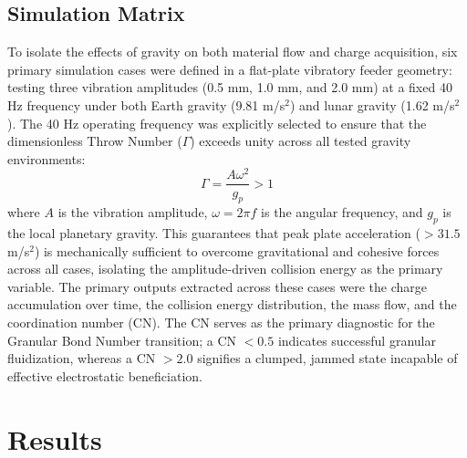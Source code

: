 \documentclass[preprint,12pt,authoryear]{elsarticle}
\begin{document}
\subsection{Simulation Matrix}
To isolate the effects of gravity on both material flow and charge acquisition, six primary simulation cases were defined in a flat-plate vibratory feeder geometry: testing three vibration amplitudes (0.5 mm, 1.0 mm, and 2.0 mm) at a fixed 40 Hz frequency under both Earth gravity (9.81 m/s$^2$) and lunar gravity (1.62 m/s$^2$). The 40 Hz operating frequency was explicitly selected to ensure that the dimensionless Throw Number ($\Gamma$) exceeds unity across all tested gravity environments:
\begin{equation}
\Gamma = \frac{A \omega^2}{g_p} > 1
\end{equation}
where $A$ is the vibration amplitude, $\omega = 2\pi f$ is the angular frequency, and $g_p$ is the local planetary gravity. This guarantees that peak plate acceleration ($> 31.5$ m/s$^2$) is mechanically sufficient to overcome gravitational and cohesive forces across all cases, isolating the amplitude-driven collision energy as the primary variable. The primary outputs extracted across these cases were the charge accumulation over time, the collision energy distribution, the mass flow, and the coordination number (CN). The CN serves as the primary diagnostic for the Granular Bond Number transition; a CN $< 0.5$ indicates successful granular fluidization, whereas a CN $> 2.0$ signifies a clumped, jammed state incapable of effective electrostatic beneficiation.

\section{Results}
\label{sec:results}
\end{document}
